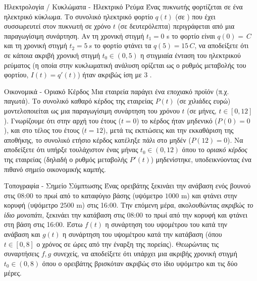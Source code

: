 \begin{problhma}{Ηλεκτρολογία / Κυκλώματα  - Ηλεκτρικό Ρεύμα}
Ένας πυκνωτής φορτίζεται σε ένα ηλεκτρικό κύκλωμα. Το συνολικό ηλεκτρικό φορτίο $q(t)$ (σε ) που έχει συσσωρευτεί στον πυκνωτή σε χρόνο $t$ (σε δευτερόλεπτα) περιγράφεται από μια παραγωγίσιμη συνάρτηση. Αν τη χρονική στιγμή $t_1 = 0$ s το φορτίο είναι $q(0) =\,\si{C}$ και τη χρονική στιγμή $t_2 = 5\,\si{s}$ το φορτίο φτάνει τα $q(5) = 15\,\si{C}$, να αποδείξετε ότι σε κάποια ακριβή χρονική στιγμή $t_0 \in (0, 5)$ η στιγμιαία ένταση του ηλεκτρικού ρεύματος (η οποία στην κυκλωματική ανάλυση ορίζεται ως ο ρυθμός μεταβολής του φορτίου, $I(t) = q'(t)$) ήταν ακριβώς ίση με $3$ .
\end{problhma}

\begin{problhma}{Οικονομικά - Οριακό Κέρδος}
Μια εταιρεία παράγει ένα εποχιακό προϊόν (π.χ. παγωτά). Το συνολικό καθαρό κέρδος της εταιρείας $P(t)$ (σε χιλιάδες ευρώ) μοντελοποιείται ως μια παραγωγίσιμη συνάρτηση του χρόνου $t$ (σε μήνες, $t \in [0, 12]$). Γνωρίζουμε ότι στην αρχή του έτους ($t=0$) το κέρδος ήταν μηδενικό ($P(0)=0$), και στο τέλος του έτους ($t=12$), μετά τις εκπτώσεις και την εκκαθάριση της αποθήκης, το συνολικό ετήσιο κέρδος κατέληξε πάλι στο μηδέν ($P(12)=0$). 
Να αποδείξετε ότι υπήρξε τουλάχιστον ένας μήνας $t_0 \in (0, 12)$ όπου το \textit{οριακό κέρδος} της εταιρείας (δηλαδή ο ρυθμός μεταβολής $P'(t)$) μηδενίστηκε, υποδεικνύοντας ένα πιθανό σημείο οικονομικής καμπής.
\end{problhma}

\begin{problhma}{Τοπογραφία - Σημείο Σύμπτωσης}
Ένας ορειβάτης ξεκινάει την ανάβαση ενός βουνού στις 08:00 το πρωί από το καταφύγιο βάσης (υψόμετρο $1000$ \si{m}) και φτάνει στην κορυφή (υψόμετρο $2500$ m) στις 16:00. Την επόμενη μέρα, ακολουθώντας \textit{ακριβώς το ίδιο μονοπάτι}, ξεκινάει την κατάβαση στις 08:00 το πρωί από την κορυφή και φτάνει στη βάση στις 16:00. 
Έστω $f(t)$ η συνάρτηση του υψομέτρου του κατά την ανάβαση και $g(t)$ η συνάρτηση του υψομέτρου κατά την κατάβαση (όπου $t \in [0, 8]$ ο χρόνος σε ώρες από την έναρξη της πορείας). Θεωρώντας τις συναρτήσεις $f, g$ συνεχείς, να αποδείξετε ότι υπάρχει μια ακριβής χρονική στιγμή $t_0 \in (0, 8)$ όπου ο ορειβάτης βρισκόταν ακριβώς στο ίδιο υψόμετρο και τις δύο μέρες.
\end{problhma}

